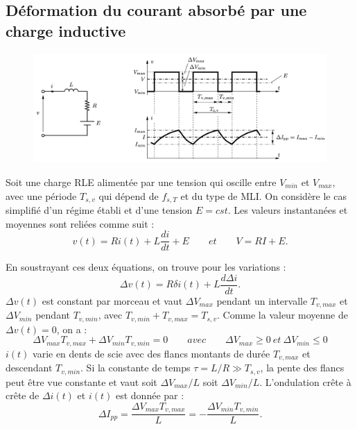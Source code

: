 	\subsection{Déformation du courant absorbé par une charge inductive}
		\begin{figure}
		\vspace{-5mm}
		\includegraphics[scale=0.25]{ch4/14}
		\end{figure}
		Soit une charge RLE alimentée par une tension qui oscille entre $V_{min}$ et $V_{max}$, avec une période $T_{s,v}$ qui dépend de $f_{s,T}$ et du type de MLI. On considère le cas simplifié d'un régime établi et d'une tension $E=cst$. Les valeurs instantanées et moyennes sont reliées comme suit :\\
		\begin{equation}
			v(t) = Ri(t) + L\frac{di}{dt} + E \qquad et \qquad V = RI + E.
		\end{equation}
		
		En soustrayant ces deux équations, on trouve pour les variations :
		\begin{equation}
			\Delta v(t) = R\delta i(t) + L\frac{d\Delta i}{dt}.
		\end{equation}
		$\Delta v(t)$ est constant par morceau et vaut $\Delta V_{max}$ pendant un intervalle $T_{v,max}$ et $\Delta V_{min}$ pendant $T_{v,min}$, avec $T_{v,min} + T_{v,max} = T_{s,v}$. Comme la valeur moyenne de $\Delta v(t) = 0$, on a :
		\begin{equation}
			\Delta V_{max}T_{v,max} + \Delta V_{min}T_{v,min} = 0 \qquad avec \qquad \Delta V_{max} \geq 0 \ et \ \Delta V_{min} \leq 0
		\end{equation}
		$i(t)$ varie en dents de scie avec des flancs montants de durée $T_{v,max}$ et descendant $T_{v,min}$. Si la constante de temps $\tau = L/R \gg T_{s,v}$, la pente des flancs peut être vue constante et vaut soit $\Delta V_{max}/L$ soit $\Delta V_{min}/L$. L'ondulation crête à crête de $\Delta i(t)$ et $i(t)$ est donnée par :
		\begin{equation}
			\Delta I_{pp} = \frac{\Delta V_{max}T_{v,max}}{L} = -\frac{\Delta V_{min}T_{v,min}}{L}.
		\end{equation}
		
